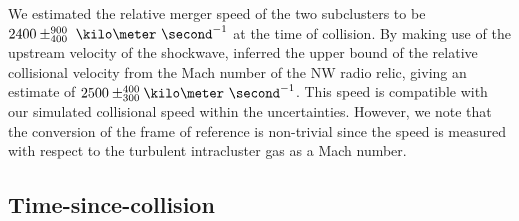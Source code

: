 	We estimated the relative merger speed of the two subclusters to be
$2400\pm^{900}_{400}~\kilo\meter~\second^{-1}$ at the time of collision. 
By making use of the upstream velocity of the shockwave, \cite{L13}
inferred the upper bound of the relative collisional velocity from the Mach
number of the NW radio relic, giving an estimate of $2500
\pm^{400}_{300}\kilo\meter~\second^{-1}$.  This speed is compatible with our
simulated collisional speed within the uncertainties. 
However, we note that
the conversion of the frame of reference is non-trivial since the speed is
measured with respect to the turbulent intracluster gas as a Mach number.




%
%
\subsection{Time-since-collision}  
%


